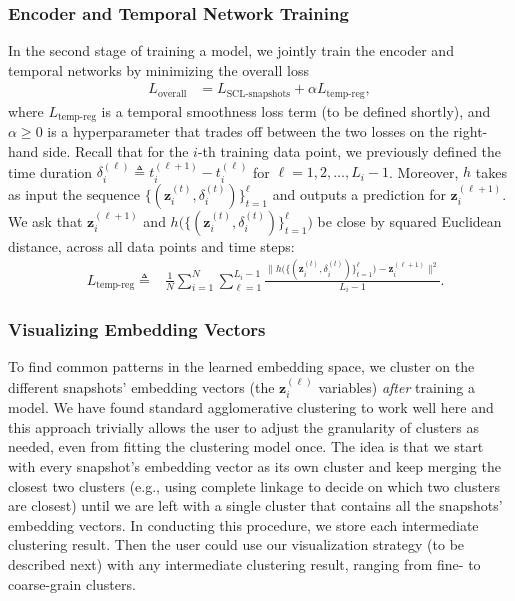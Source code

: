 \subsubsection{Encoder and Temporal Network Training}
\label{ch02:sec:joint-optimization}

 
\label{ch02:sec:transform}

In the second stage of training a  model, we jointly train the encoder and temporal networks by minimizing the overall loss
\begin{align}
    L_{\text{overall}} &=L_{\text{SCL-snapshots}}+ \alpha L_{\text{temp-reg}},
\label{ch02:eq:mainLoss}
\end{align}
where $L_{\text{temp-reg}}$ is a temporal smoothness loss term (to be defined shortly), and ${\alpha\ge0}$ is a hyperparameter that trades off between the two losses on the right-hand side.
Recall that for the \mbox{$i$-th} training data point, we previously defined the time duration $\delta_i^{(\ell)}\triangleq t_i^{(\ell+1)} - t_i^{(\ell)}$ for $\ell=1,2,\dots,{L_i-1}$. 
Moreover, $h$ takes as input the sequence $\{(\mathbf{z}_i^{(t)},\delta_i^{(t)})\}_{t=1}^{\ell}$ and outputs a prediction for $\mathbf{z}_i^{(\ell+1)}$. 
We ask that $\mathbf{z}_i^{(\ell+1)}$ and $h\big(\{(\mathbf{z}_i^{(t)},\delta_i^{(t)})\}_{t=1}^{\ell}\big)$ be close by squared Euclidean distance, across all data points and time steps:
\begin{align*}
&L_{\text{temp-reg}}
\!\triangleq \!\!\!\!\!
&\!\frac{1}{N}\!\sum_{i=1}^N  \! \sum_{\ell=1}^{L_i - 1} \! \frac{
\big\| h\big(\{(\mathbf{z}_i^{(t)},\delta_i^{(t)})\}_{t=1}^{\ell}\big)
\!-\! \mathbf{z}_i^{(\ell+1)} \big\|^2 }{L_i-1}.
\end{align*}


\subsubsection{Visualizing Embedding Vectors}
\label{ch02:sec:visualizing}


To find common patterns in the learned embedding space, we cluster on the different snapshots' embedding vectors (the $\mathbf{z}_i^{(\ell)}$ variables) \emph{after} training a  model.
We have found standard agglomerative clustering \citep{murtagh2012algorithms} to work well here and this approach trivially allows the user to adjust the granularity of clusters as needed, even from fitting the clustering model once.
The idea is that we start with every snapshot's embedding vector as its own cluster and keep merging the closest two clusters (e.g., using complete linkage to decide on which two clusters are closest) until we are left with a single cluster that contains all the snapshots' embedding vectors.
In conducting this procedure, we store each intermediate clustering result.
Then the user could use our visualization strategy (to be described next) with any intermediate clustering result, ranging from fine- to coarse-grain clusters.

